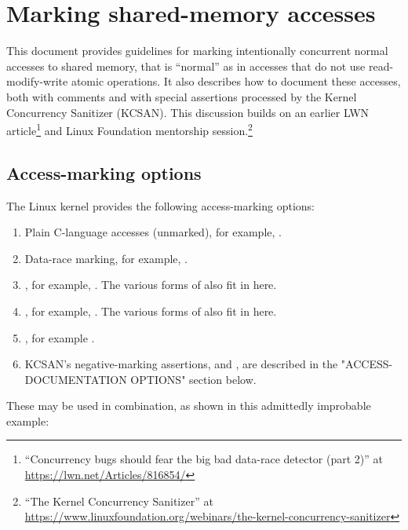 \section{Marking shared-memory accesses}

This document provides guidelines for marking intentionally concurrent
normal accesses to shared memory, that is ``normal'' as in accesses that do
not use read-modify-write atomic operations.
It also describes how to document these accesses, both with comments and
with special assertions processed by the Kernel Concurrency Sanitizer (KCSAN).
This discussion builds on an earlier LWN article\footnote{
``Concurrency bugs should fear the big bad data-race detector (part 2)'' at
\url{https://lwn.net/Articles/816854/}
} and Linux Foundation mentorship session.\footnote{
``The Kernel Concurrency Sanitizer'' at
\url{https://www.linuxfoundation.org/webinars/the-kernel-concurrency-sanitizer}
}

\subsection{Access-marking options}

The Linux kernel provides the following access-marking options:

\begin{enumerate}
\item	Plain C-language accesses (unmarked), for example, .

\item	Data-race marking, for example, .

\item	{}, for example, .
	The various forms of  also fit in here.

\item	{}, for example, .
	The various forms of  also fit in here.

\item	{}, for example .

\item	KCSAN's negative-marking assertions, 
	and , are described in the
	"ACCESS-DOCUMENTATION OPTIONS" section below.
\end{enumerate}

These may be used in combination, as shown in this admittedly improbable
example:

